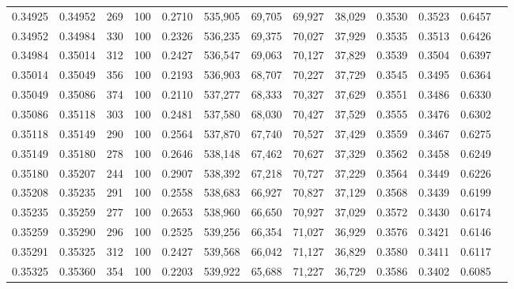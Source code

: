 \begin{tabular}{rrrrrrrrrrrrr}
0.34925 & 0.34952 &   269 & 100 &                                     0.2710 & 535,905 &  69,705 &  69,927 &  38,029 & 0.3530 & 0.3523 & 0.6457 \\
0.34952 & 0.34984 &   330 & 100 &                                     0.2326 & 536,235 &  69,375 &  70,027 &  37,929 & 0.3535 & 0.3513 & 0.6426 \\
0.34984 & 0.35014 &   312 & 100 &                                     0.2427 & 536,547 &  69,063 &  70,127 &  37,829 & 0.3539 & 0.3504 & 0.6397 \\
0.35014 & 0.35049 &   356 & 100 &                                     0.2193 & 536,903 &  68,707 &  70,227 &  37,729 & 0.3545 & 0.3495 & 0.6364 \\
0.35049 & 0.35086 &   374 & 100 &                                     0.2110 & 537,277 &  68,333 &  70,327 &  37,629 & 0.3551 & 0.3486 & 0.6330 \\
0.35086 & 0.35118 &   303 & 100 &                                     0.2481 & 537,580 &  68,030 &  70,427 &  37,529 & 0.3555 & 0.3476 & 0.6302 \\
0.35118 & 0.35149 &   290 & 100 &                                     0.2564 & 537,870 &  67,740 &  70,527 &  37,429 & 0.3559 & 0.3467 & 0.6275 \\
0.35149 & 0.35180 &   278 & 100 &                                     0.2646 & 538,148 &  67,462 &  70,627 &  37,329 & 0.3562 & 0.3458 & 0.6249 \\
0.35180 & 0.35207 &   244 & 100 &                                     0.2907 & 538,392 &  67,218 &  70,727 &  37,229 & 0.3564 & 0.3449 & 0.6226 \\
0.35208 & 0.35235 &   291 & 100 &                                     0.2558 & 538,683 &  66,927 &  70,827 &  37,129 & 0.3568 & 0.3439 & 0.6199 \\
0.35235 & 0.35259 &   277 & 100 &                                     0.2653 & 538,960 &  66,650 &  70,927 &  37,029 & 0.3572 & 0.3430 & 0.6174 \\
0.35259 & 0.35290 &   296 & 100 &                                     0.2525 & 539,256 &  66,354 &  71,027 &  36,929 & 0.3576 & 0.3421 & 0.6146 \\
0.35291 & 0.35325 &   312 & 100 &                                     0.2427 & 539,568 &  66,042 &  71,127 &  36,829 & 0.3580 & 0.3411 & 0.6117 \\
0.35325 & 0.35360 &   354 & 100 &                                     0.2203 & 539,922 &  65,688 &  71,227 &  36,729 & 0.3586 & 0.3402 & 0.6085 \\

\end{tabular}
